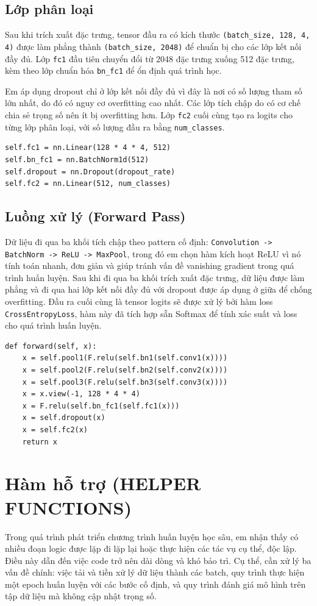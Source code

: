 \documentclass[12pt, a4paper, openany]{report}
\begin{document}
\subsection{Lớp phân loại}
Sau khi trích xuất đặc trưng, tensor đầu ra có kích thước \texttt{(batch\_size, 128, 4, 4)} được làm phẳng thành \texttt{(batch\_size, 2048)} để chuẩn bị cho các lớp kết nối đầy đủ. Lớp \texttt{fc1} đầu tiên chuyển đổi từ 2048 đặc trưng xuống 512 đặc trưng, kèm theo lớp chuẩn hóa \texttt{bn\_fc1} để ổn định quá trình học. 

Em áp dụng dropout chỉ ở lớp kết nối đầy đủ vì đây là nơi có số lượng tham số lớn nhất, do đó có nguy cơ overfitting cao nhất. Các lớp tích chập do có cơ chế chia sẻ trọng số nên ít bị overfitting hơn. Lớp \texttt{fc2} cuối cùng tạo ra logits cho từng lớp phân loại, với số lượng đầu ra bằng \texttt{num\_classes}.

\begin{verbatim}
self.fc1 = nn.Linear(128 * 4 * 4, 512)
self.bn_fc1 = nn.BatchNorm1d(512)
self.dropout = nn.Dropout(dropout_rate)
self.fc2 = nn.Linear(512, num_classes)
\end{verbatim}

\subsection{Luồng xử lý (Forward Pass)}
Dữ liệu đi qua ba khối tích chập theo pattern cố định: \texttt{Convolution -> BatchNorm -> ReLU -> MaxPool}, trong đó em chọn hàm kích hoạt ReLU vì nó tính toán nhanh, đơn giản và giúp tránh vấn đề vanishing gradient trong quá trình huấn luyện. Sau khi đi qua ba khối trích xuất đặc trưng, dữ liệu được làm phẳng và đi qua hai lớp kết nối đầy đủ với dropout được áp dụng ở giữa để chống overfitting. Đầu ra cuối cùng là tensor logits sẽ được xử lý bởi hàm loss \texttt{CrossEntropyLoss}, hàm này đã tích hợp sẵn Softmax để tính xác suất và loss cho quá trình huấn luyện.

\begin{verbatim}
def forward(self, x):
    x = self.pool1(F.relu(self.bn1(self.conv1(x))))
    x = self.pool2(F.relu(self.bn2(self.conv2(x))))
    x = self.pool3(F.relu(self.bn3(self.conv3(x))))
    x = x.view(-1, 128 * 4 * 4)
    x = F.relu(self.bn_fc1(self.fc1(x)))
    x = self.dropout(x)
    x = self.fc2(x)
    return x
\end{verbatim}

\section{Hàm hỗ trợ (HELPER FUNCTIONS)}
Trong quá trình phát triển chương trình huấn luyện học sâu, em nhận thấy có nhiều đoạn logic được lặp đi lặp lại hoặc thực hiện các tác vụ cụ thể, độc lập. Điều này dẫn đến việc code trở nên dài dòng và khó bảo trì. Cụ thể, cần xử lý ba vấn đề chính: việc tải và tiền xử lý dữ liệu thành các batch, quy trình thực hiện một epoch huấn luyện với các bước cố định, và quy trình đánh giá mô hình trên tập dữ liệu mà không cập nhật trọng số.
\end{document}
